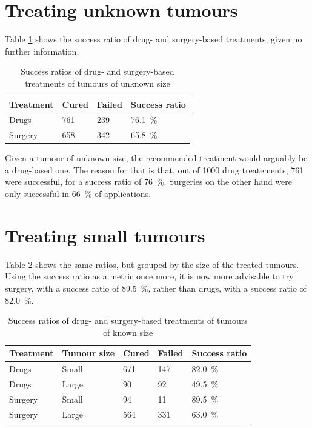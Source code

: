 \documentclass[a4paper]{scrreprt}
\begin{document}
\section{Treating unknown tumours}

Table \ref{tbl:treating_unknown_tumours} shows the success ratio of drug- and
surgery-based treatments, given no further information.

\begin{table}
		\centering
		\begin{tabular}{llll}
				\toprule
				Treatment & Cured & Failed & Success ratio \\
				\midrule
				Drugs   & 761     & 239    &    \SI{76.1}{\percent} \\
				Surgery & 658     & 342    &    \SI{65.8}{\percent} \\
				\bottomrule
		\end{tabular}
		\caption{Success ratios of drug- and surgery-based treatments of tumours of unknown size}
		\label{tbl:treating_unknown_tumours}
\end{table}

Given a tumour of unknown size, the recommended treatment would arguably be a
drug-based one. The reason for that is that, out of 1000 drug treatements,
761 were successful, for a success ratio of \SI{76}{\percent}. Surgeries on the
other hand were only successful in \SI{66}{\percent} of applications.

\section{Treating small tumours}

Table \ref{tbl:treating_tumours_known_size} shows the same ratios, but grouped
by the size of the treated tumours. Using the success ratio as a metric once
more, it is now more advisable to try surgery, with a success ratio of
\SI{89.5}{\percent}, rather than drugs, with a success ratio of
\SI{82.0}{\percent}.

\begin{table}
		\centering
		\begin{tabular}{lllll}
				\toprule
				Treatment & Tumour size & Cured & Failed & Success ratio \\
				\midrule
				Drugs     & Small       & 671   & 147    &    \SI{82.0}{\percent} \\
				Drugs     & Large       & 90    & 92     &    \SI{49.5}{\percent} \\
				Surgery   & Small       & 94    & 11     &    \SI{89.5}{\percent} \\
				Surgery   & Large       & 564   & 331    &    \SI{63.0}{\percent} \\
				\bottomrule
		\end{tabular}
		\caption{Success ratios of drug- and surgery-based treatments of tumours of known size}
		\label{tbl:treating_tumours_known_size}
\end{table}
\end{document}

